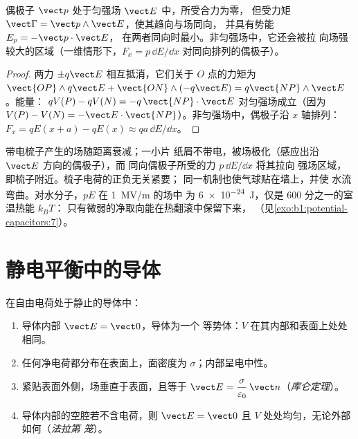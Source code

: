 \begin{proposition}[外场中的偶极子]\label{prop:b1:potential-capacitors:dipoleinfield}
偶极子 $\vect p$ 处于匀强场 $\vect E$ 中，所受合力为零，
但受力矩 $\vect\Gamma = \vect p\wedge\vect E$，使其趋向与场同向，
并具有势能 $E_p = -\vect p\cdot\vect E$，
在两者同向时最小。非匀强场中，它还会被拉
向场强较大的区域（一维情形下，$F_x = p\,\dd E/\dd x$
对同向排列的偶极子）。
\end{proposition}

\begin{proof}
两力 $\pm q\vect E$ 相互抵消，它们关于 $O$ 点的力矩为 $\vect{OP}\wedge
q\vect E + \vect{ON}\wedge(-q\vect E) = q\vect{NP}\wedge\vect E$。能量：
$qV(P) - qV(N) = -q\,\vect{NP}\cdot\vect E$ 对匀强场成立（因为 $V(P)
- V(N) = -\vect E\cdot\vect{NP}$）。非匀强场中，偶极子沿 $x$ 轴排列：$F_x =
qE(x + a) - qE(x) \approx qa\,\dd E/\dd x$。
\end{proof}

\begin{example}[梳子为何能吸引纸屑]\label{ex:b1:potential-capacitors:comb}
带电梳子产生的场随距离衰减；一小片
纸屑不带电，被场极化（感应出沿 $\vect E$ 方向的偶极子），而
同向偶极子所受的力 $p\,\dd E/\dd x$ 将其拉向
强场区域，即梳子附近。梳子电荷的正负无关紧要；
同一机制也使气球贴在墙上，并使
水流弯曲。对水分子，$pE$ 在 \qty{1}{MV/m} 的场中
为 \qty{6e-24}{J}，仅是 $600$ 分之一的室温热能 $k_BT$：
只有微弱的净取向能在热翻滚中保留下来，
（见\cref{exo:b1:potential-capacitors:7}）。
\end{example}

\section{静电平衡中的导体}

\begin{theorem}[平衡导体的性质]\label{thm:b1:potential-capacitors:conductor}
在自由电荷处于静止的导体中：
\begin{enumerate}
  \item 导体内部 $\vect E = \vect 0$，导体为一个
        等势体：$V$ 在其内部和表面上处处相同。
  \item 任何净电荷都分布在表面上，面密度为
        $\sigma$；内部呈电中性。
  \item 紧贴表面外侧，场垂直于表面，且等于
        $\vect E = \dfrac{\sigma}{\varepsilon_0}\,\vect n$（\emph{库仑定理}）。
  \item 导体内部的空腔若不含电荷，则 $\vect E =
        \vect 0$ 且 $V$ 处处均匀，无论外部如何（\emph{法拉第
        笼}）。
\end{enumerate}
\end{theorem}

